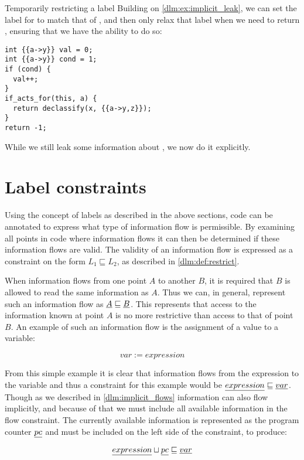 \begin{example}{Temporarily restricting a label}
  Building on \cref{dlm:ex:implicit_leak}, we can set the label for  to match that of , and then only relax that label when we need to return , ensuring that we have the ability to do so:
  \begin{lstlisting}[style=dlmc]
int {{a->y}} val = 0;
int {{a->y}} cond = 1;
if (cond) {
  val++;
}
if_acts_for(this, a) {
  return declassify(x, {{a->y,z}});
}
return -1;
  \end{lstlisting}
  While we still leak some information about , we now do it explicitly.
\end{example}

\section{Label constraints}
Using the concept of labels as described in the above sections, code can be annotated to express what type of information flow is permissible.
By examining all points in code where information flows it can then be determined if these information flows are valid.
The validity of an information flow is expressed as a constraint on the form $L_1 \sqsubseteq L_2$, as described in \cref{dlm:def:restrict}.

When information flows from one point $A$ to another $B$, it is required that $B$ is allowed to read the same information as $A$.
Thus we can, in general, represent such an information flow as $\underline{A} \sqsubseteq \underline{B}$.
This represents that access to the information known at point $A$ is no more restrictive than access to that of point $B$.
An example of such an information flow is the assignment of a value to a variable:

$$var := expression$$

From this simple example it is clear that information flows from the expression to the variable and thus a constraint for this example would be $\underline{expression} \sqsubseteq \underline{var}$.
Though as we described in \cref{dlm:implicit_flows} information can also flow implicitly, and because of that we must include all available information in the flow constraint.
The currently available information is represented as the program counter $\underline{pc}$ and must be included on the left side of the constraint, to produce:

$$\underline{expression} \sqcup \underline{pc} \sqsubseteq \underline{var}$$

